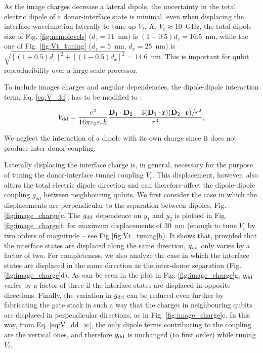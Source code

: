 As the image charges decrease a lateral dipole, the uncertainty in the total electric dipole of a donor-interface state is minimal, even when displacing the interface wavefunction laterally to tune up $V_t$. At $V_t\approx10$~GHz, the total dipole size of Fig. \ref{fig:nemolevels} ($d_z=11$~nm) is $(1+0.5)d_z=16.5$~nm, while the one of Fig. \ref{fig:Vt_tuning} ($d_z=5$~nm, $d_x=25$~nm) is $\sqrt{[(1+0.5)d_z]^2+[(1-0.5)d_x]^2}=14.6$~nm. This is important for qubit reproducibility over a large scale processor.

To include images charges and angular dependencies, the dipole-dipole interaction term, Eq. \ref{eq:V_dd}, has to be modified to \cite{Ravets2014}:

\begin{equation} \label{eq:V_dd_ic}
V_{\rm dd}=\frac{e^2}{16\pi\varepsilon_0\varepsilon_r h}\frac{\textbf{D}_1\cdot\textbf{D}_2-3(\textbf{D}_1\cdot\textbf{r})(\textbf{D}_2\cdot\textbf{r})/r^2}{r^3},
\end{equation}

We neglect the interaction of a dipole with its own charge since it does not produce inter-donor coupling.

Laterally displacing the interface charge is, in general, necessary for the purpose of tuning the donor-interface tunnel coupling $V_t$. This displacement, however, also alters the total electric dipole direction and can therefore affect the dipole-dipole coupling $g_{dd}$ between neighbouring qubits. We first consider the case in which the displacements are perpendicular to the separation between dipoles,  Fig. \ref{fig:image_charge}c. The $g_{\rm dd}$ dependence on $y_1$ and $y_2$ is plotted in Fig. \ref{fig:image_charge}f, for maximum displacements of 30~nm (enough to tune $V_t$ by two orders of magnitude -- see Fig \ref{fig:Vt_tuning}b). It shows that, provided that the interface states are displaced along the same direction, $g_{\rm dd}$ only varies by a factor of two. For completeness, we also analyze the case in which the interface states are displaced in the same direction as the inter-donor separation (Fig. \ref{fig:image_charge}d). As can be seen in the plot in Fig. \ref{fig:image_charge}g, $g_{\rm dd}$ varies by a factor of three if the interface states are displaced in opposite directions. Finally, the variation in $g_{\rm dd}$ can be reduced even further by fabricating the gate stack in such a way that the charges in neighbouring qubits are displaced in perpendicular directions, as in Fig. \ref{fig:image_charge}e. In this way, from Eq. \ref{eq:V_dd_ic}, the only dipole terms contributing to the coupling are the vertical ones, and therefore $g_{\rm dd}$ is unchanged (to first order) while tuning $V_t$.

